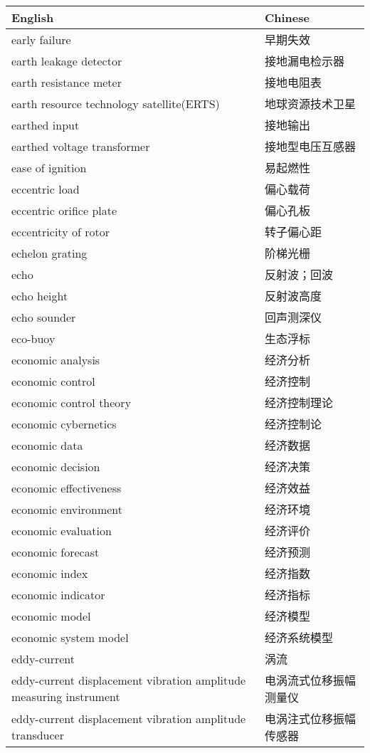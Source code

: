 \documentclass[
]{article}
\begin{document}
\begin{longtable}[]{@{}ll@{}}
\toprule()
English & Chinese \\
\midrule()
\endhead
early failure & 早期失效 \\
earth leakage detector & 接地漏电检示器 \\
earth resistance meter & 接地电阻表 \\
earth resource technology satellite(ERTS) & 地球资源技术卫星 \\
earthed input & 接地输出 \\
earthed voltage transformer & 接地型电压互感器 \\
ease of ignition & 易起燃性 \\
eccentric load & 偏心载荷 \\
eccentric orifice plate & 偏心孔板 \\
eccentricity of rotor & 转子偏心距 \\
echelon grating & 阶梯光栅 \\
echo & 反射波；回波 \\
echo height & 反射波高度 \\
echo sounder & 回声测深仪 \\
eco-buoy & 生态浮标 \\
economic analysis & 经济分析 \\
economic control & 经济控制 \\
economic control theory & 经济控制理论 \\
economic cybernetics & 经济控制论 \\
economic data & 经济数据 \\
economic decision & 经济决策 \\
economic effectiveness & 经济效益 \\
economic environment & 经济环境 \\
economic evaluation & 经济评价 \\
economic forecast & 经济预测 \\
economic index & 经济指数 \\
economic indicator & 经济指标 \\
economic model & 经济模型 \\
economic system model & 经济系统模型 \\
eddy-current & 涡流 \\
eddy-current displacement vibration amplitude measuring instrument &
电涡流式位移振幅测量仪 \\
eddy-current displacement vibration amplitude transducer &
电涡注式位移振幅传感器 \\

\end{longtable}
\end{document}
